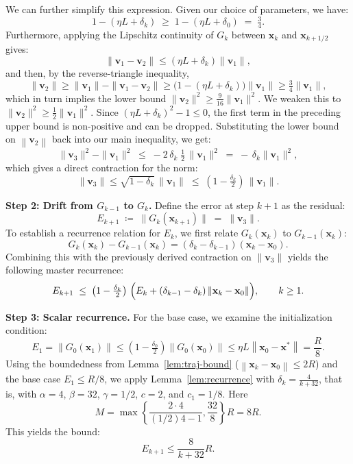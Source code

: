 \documentclass[letterpaper,11pt]{article}
\newcommand{\parenth}[1]{\left( #1 \right)}
\newcommand{\norm}[1]{\left\| #1 \right\|}
\newcommand{\vect}[1]{\mathbf{#1}}
\begin{document}
We can further simplify this expression. Given our choice of parameters, we have:
\[
1 - (\eta L + \delta_{k})\;\ge\; 1 - (\eta L + \delta_0) \;=\; \tfrac34.
\]
Furthermore, applying the Lipschitz continuity of $G_k$ between $\vect{x}_k$ and $\vect{x}_{k+1/2}$ gives:
\[
\|\vect{v}_1 - \vect{v}_2\|\le(\eta L + \delta_{k})\|\vect{v}_1\|,
\]
and then, by the reverse-triangle inequality,
\[
\|\vect{v}_2\|\ge\|\vect{v}_1\| - \|\vect{v}_1 - \vect{v}_2\|
\ge\bigl(1 - (\eta L+\delta_k)\bigr)\|\vect{v}_1\|
\ge\tfrac34\|\vect{v}_1\|,
\]
which in turn implies the lower bound \(\|\vect{v}_2\|^2\ge\tfrac{9}{16}\|\vect{v}_1\|^2\). We weaken this to \(\|\vect{v}_2\|^2\ge\tfrac12\|\vect{v}_1\|^2\). Since \((\eta L+\delta_k)^2-1\le0\), the first term in the preceding upper bound is non-positive and can be dropped. Substituting the lower bound on \(\norm{\vect{v}_2}\) back into our main inequality, we get:
\[
\|\vect{v}_3\|^2 - \|\vect{v}_1\|^2
\;\le\;-2\,\delta_{k}\;\tfrac12\,\|\vect{v}_1\|^2
\;=\;-\,\delta_k \|\vect{v}_1\|^2,
\]
which gives a direct contraction for the norm:
\[
\|\vect{v}_3\|\le\sqrt{1 - \delta_{k}}\,\|\vect{v}_1\|
\;\le\;(1 - \tfrac{\delta_{k}}{2})\,\|\vect{v}_1\|.
\]

\smallskip
\noindent\textbf{Step 2: Drift from \(G_{k-1}\) to \(G_k\).}
Define the error at step $k+1$ as the residual:
\[
E_{k+1}\;\coloneqq\;\|G_{k}(\vect{x}_{k+1})\|\;=\;\|\vect{v}_3\|.
\]
To establish a recurrence relation for $E_k$, we first relate $G_k(\vect{x}_k)$ to $G_{k-1}(\vect{x}_k)$:
\[
G_{k}(\vect{x}_k)-G_{k-1}(\vect{x}_k)
=(\delta_{k}-\delta_{k-1})(\vect{x}_k-\vect{x}_0).
\]
Combining this with the previously derived contraction on $\|\vect{v}_3\|$ yields the following master recurrence:
\begin{equation}\label{eq:monotone-norm-recurrence}
E_{k+1}
\;\le\; \parenth{1 - \tfrac{\delta_{k}}{2}}\,
\Bigl(E_k + (\delta_{k-1}-\delta_{k})\norm{\vect{x}_k-\vect{x}_0}\Bigr),
\qquad k\ge1.
\end{equation}

\smallskip
\noindent\textbf{Step 3: Scalar recurrence.}
For the base case, we examine the initialization condition:
\begin{equation*}
E_1 = \norm{G_0(\vect{x}_1)} \le \parenth{1 - \tfrac{\delta_0}{2}} \norm{G_0(\vect{x}_0)} \le \eta L \norm{\vect{x}_0 - \vect{x}^*} = \frac{R}{8}.
\end{equation*} 
Using the boundedness from Lemma~\ref{lem:traj-bound} (\(\norm{\vect{x}_k - \vect{x}_0} \le 2R\)) and the base case \(E_1 \le R/8\), we apply Lemma~\ref{lem:recurrence} with \(\delta_k = \frac{4}{k+32}\), that is, with \(\alpha=4\), \(\beta=32\), \(\gamma=1/2\), \(c=2\), and \(c_1=1/8\). Here
\[
M=\max\left\{\frac{2\cdot4}{(1/2)4-1},\frac{32}{8}\right\}R=8R.
\]
This yields the bound:
\[
  E_{k+1} \le \frac{8}{k + 32} R.
\]
\end{document}
